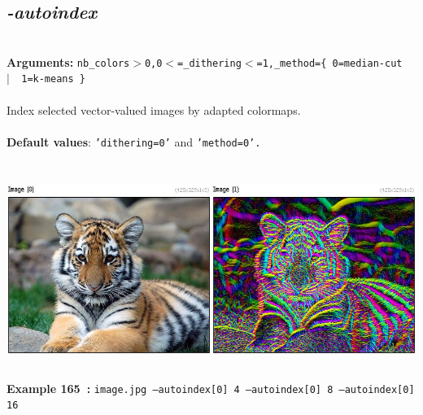 \documentclass[a4paper,11pt,twoside]{book}
\begin{document}
\subsection{\emph{-autoindex} }\vspace*{-0.5em}
~\\\textbf{Arguments: } 
{\small \texttt{nb\_colors$>$0,0$<$=\_dithering$<$=1,\_method=\{ 0=median-cut ~$|$~ 1=k-means \}}}\\~\\
Index selected vector-valued images by adapted colormaps.
~\\~\\\textbf{Default values}: {\small \texttt{'dithering=0'} and \texttt{'method=0'.}}
\begin{center}\includegraphics[keepaspectratio=true,height=7cm,width=\textwidth]{img/gmic_def165.jpg}\\
{\footnotesize \textbf{Example 165~:} \texttt{image.jpg --autoindex[0] 4 --autoindex[0] 8 --autoindex[0] 16}}
\end{center}
\end{document}
